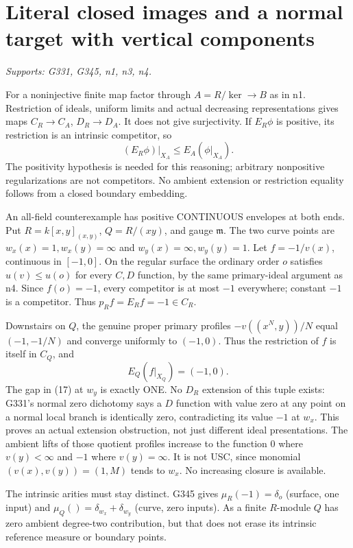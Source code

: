 \section{Literal closed images and a normal target with vertical components}
\textit{Supports: G331, G345, n1, n3, n4.}

For a noninjective finite map factor through $A=R/\ker\to B$ as in n1. Restriction of ideals, uniform limits and actual decreasing representations gives maps $C_R\to C_A$, $D_R\to D_A$. It does not give surjectivity. If $E_R\phi$ is positive, its restriction is an intrinsic competitor, so
\[
(E_R\phi)|_{X_A}\le E_A(\phi|_{X_A}).                 \tag{17}
\]
The positivity hypothesis is needed for this reasoning; arbitrary nonpositive regularizations are not competitors. No ambient extension or restriction equality follows from a closed boundary embedding.

An all-field counterexample has positive CONTINUOUS envelopes at both ends. Put $R=k[x,y]_{(x,y)}$, $Q=R/(xy)$, and gauge $\mathfrak m$. The two curve points are $w_x(x)=1,w_x(y)=\infty$ and $w_y(x)=\infty,w_y(y)=1$. Let $f=-1/v(x)$, continuous in $[-1,0]$. On the regular surface the ordinary order $o$ satisfies $u(v)\le u(o)$ for every $C,D$ function, by the same primary-ideal argument as n4. Since $f(o)=-1$, every competitor is at most $-1$ everywhere; constant $-1$ is a competitor. Thus $p_Rf=E_Rf=-1\in C_R$.

Downstairs on $Q$, the genuine proper primary profiles $-v((x^N,y))/N$ equal $(-1,-1/N)$ and converge uniformly to $(-1,0)$. Thus the restriction of $f$ is itself in $C_Q$, and
\[
E_Q(f|_{X_Q})=(-1,0).
\]
The gap in (17) at $w_y$ is exactly ONE. No $D_R$ extension of this tuple exists: G331's normal zero dichotomy says a $D$ function with value zero at any point on a normal local branch is identically zero, contradicting its value $-1$ at $w_x$. This proves an actual extension obstruction, not just different ideal presentations. The ambient lifts of those quotient profiles increase to the function $0$ where $v(y)<\infty$ and $-1$ where $v(y)=\infty$. It is not USC, since monomial $(v(x),v(y))=(1,M)$ tends to $w_x$. No increasing closure is available.

The intrinsic arities must stay distinct. G345 gives $\mu_R(-1)=\delta_o$ (surface, one input) and $\mu_Q()=\delta_{w_x}+\delta_{w_y}$ (curve, zero inputs). As a finite $R$-module $Q$ has zero ambient degree-two contribution, but that does not erase its intrinsic reference measure or boundary points.


